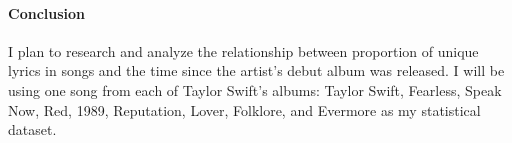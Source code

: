 \documentclass[12pt]{article}
\begin{document}
\paragraph{Conclusion}
I plan to research and analyze the relationship between proportion of unique lyrics in songs and the time since the artist's debut album was released. I will be using one song from each of Taylor Swift's albums: Taylor Swift, Fearless, Speak Now, Red, 1989, Reputation, Lover, Folklore, and Evermore as my statistical dataset. 



\end{document}
